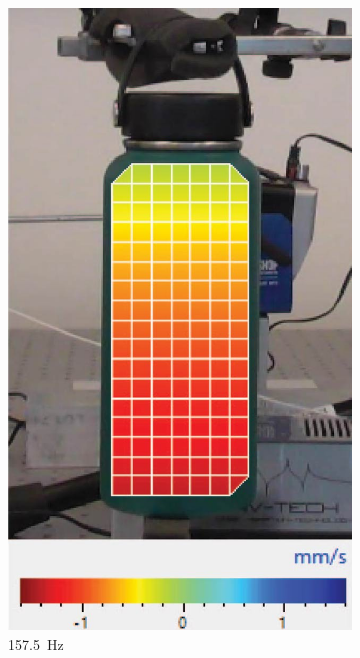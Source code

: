 \documentclass[twoside,a4paper]{article}
\begin{document}
\begin{figure}[!t]
    \centering
    \begin{subfigure}[b]{.32\columnwidth}
         \centering
         \includegraphics[width=\columnwidth]{Paper/Figures/Water_157_5.jpg}
         \caption{157.5\ Hz}
    \end{subfigure}
    \begin{subfigure}[b]{.32\columnwidth}
         \centering

\end{subfigure}
\end{figure}
\end{document}
